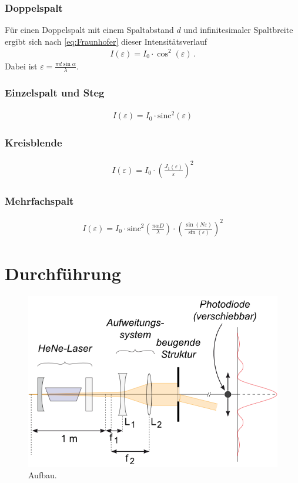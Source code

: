 \documentclass[12pt,a4paper,titlepage,headinclude,bibtotoc]{scrartcl}
\newcommand{\sinc}{\ensuremath{\mathrm{sinc}}}
\begin{document}
\subsubsection{Doppelspalt}
Für einen Doppelspalt mit einem Spaltabstand $d$ und infinitesimaler Spaltbreite ergibt sich nach \eqref{eq:Fraunhofer} dieser Intensitätsverlauf
\begin{align}
	I(\varepsilon)=I_0 \cdot \cos^2(\varepsilon) \,.
\end{align}
Dabei ist $\varepsilon= \frac{\pi d \sin \alpha}{\lambda}$.

\subsubsection{Einzelspalt und Steg}
\begin{align}
	I(\varepsilon)=I_0 \cdot \sinc^2(\varepsilon)
\end{align}

\subsubsection{Kreisblende}
\begin{align}
	I(\varepsilon)=I_0 \cdot \left(\frac{J_1(\varepsilon)}{\varepsilon}\right)^2
\end{align}

\subsubsection{Mehrfachspalt}
\begin{align}
	I(\varepsilon)=I_0 \cdot \sinc^2\left(\frac{\pi\alpha D}{\lambda}\right) \cdot \left(\frac{\sin(N\varepsilon)}{\sin(\varepsilon)}\right)^2
\end{align}

\section{Durchführung}
\label{sec:durchfuehrung}
\begin{figure}[!h]
	\centering
	\includegraphics[scale=0.7]{Aufbau.png}
	\caption{Aufbau. \cite[Datum: 02.01.15]{LP21}}
\end{figure}
\end{document}
